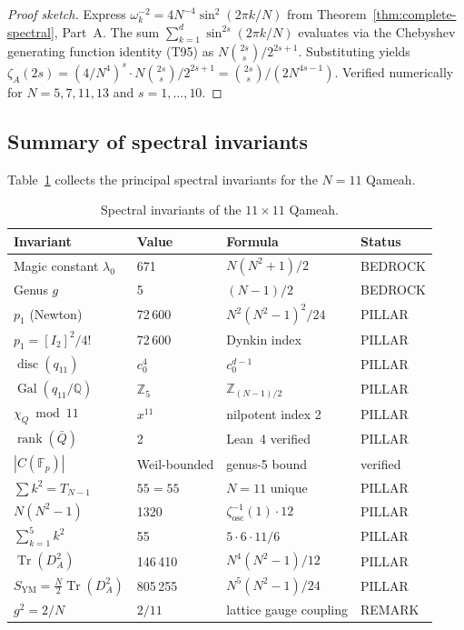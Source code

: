 \documentclass[aps,prd,twocolumn,superscriptaddress,floatfix,nofootinbib]{revtex4-2}
\theoremstyle{definition}
\theoremstyle{remark}
\begin{document}
\begin{proof}[Proof sketch]
Express $\omega_k^{-2} = 4N^{-4}\sin^2(2\pi k/N)$ from
Theorem~\ref{thm:complete-spectral}, Part~A.
The sum $\sum_{k=1}^{d}\sin^{2s}(2\pi k/N)$ evaluates via
the Chebyshev generating function identity (T95) as
$N \binom{2s}{s}/2^{2s+1}$.
Substituting yields $\zeta_A(2s) = (4/N^4)^s \cdot N\binom{2s}{s}/2^{2s+1}
= \binom{2s}{s}/(2N^{4s-1})$.
Verified numerically for $N = 5,7,11,13$ and $s = 1,\ldots,10$.
\end{proof}

\subsection{Summary of spectral invariants}
\label{sec:spectral-summary}

Table~\ref{tab:spectral-summary} collects the principal spectral invariants
for the $N=11$ Qameah.

\begin{table}[h]
\centering
\caption{Spectral invariants of the $11\times 11$ Qameah.}
\label{tab:spectral-summary}
\begin{tabular}{llll}
\hline
\textbf{Invariant} & \textbf{Value} & \textbf{Formula} & \textbf{Status} \\
\hline
Magic constant $\lambda_0$ & 671 & $N(N^2+1)/2$ & BEDROCK \\
Genus $g$ & 5 & $(N-1)/2$ & BEDROCK \\
$p_1$ (Newton) & 72\,600 & $N^2(N^2{-}1)^2/24$ & PILLAR \\
$p_1 = [I_2]^2/4!$ & 72\,600 & Dynkin index & PILLAR \\
$\operatorname{disc}(q_{11})$ & $c_0^4$ & $c_0^{d-1}$ & PILLAR \\
$\operatorname{Gal}(q_{11}/\mathbb{Q})$ & $\mathbb{Z}_5$ & $\mathbb{Z}_{(N-1)/2}$ & PILLAR \\
$\chi_Q \bmod 11$ & $x^{11}$ & nilpotent index 2 & PILLAR \\
$\operatorname{rank}(\bar{Q})$ & 2 & Lean~4 verified & PILLAR \\
$|C(\mathbb{F}_p)|$ & Weil-bounded & genus-5 bound & verified \\
$\sum k^2 = T_{N-1}$ & $55 = 55$ & $N=11$ unique & PILLAR \\
$N(N^2{-}1)$ & 1320 & $\zeta_{\mathrm{osc}}^{-1}(1)\cdot 12$ & PILLAR \\
$\sum_{k=1}^{5}k^2$ & 55 & $5\cdot 6\cdot 11/6$ & PILLAR \\
$\operatorname{Tr}(D_A^2)$ & 146\,410 & $N^4(N^2{-}1)/12$ & PILLAR \\
$S_{\mathrm{YM}} = \tfrac{N}{2}\operatorname{Tr}(D_A^2)$ & 805\,255 & $N^5(N^2{-}1)/24$ & PILLAR \\
$g^2 = 2/N$ & $2/11$ & lattice gauge coupling & REMARK \\
\hline
\end{tabular}
\end{table}
\end{document}
